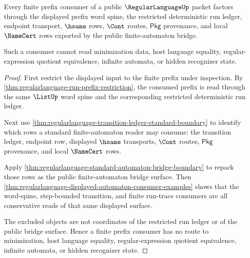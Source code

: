 \begin{theorem}
\label{thm:regularlanguage-prefix-bridge-consumer-boundary}
Every finite prefix consumer of a public $\RegularLanguageUp$ packet factors
through the displayed prefix word spine, the restricted deterministic run
ledger, endpoint transport, $\hsame$ rows, $\Cont$ routes, $\mathsf{Pkg}$
provenance, and local $\NameCert$ rows exported by the public finite-automaton
bridge.

Such a consumer cannot read minimization data, host language equality,
regular-expression quotient equivalence, infinite automata, or hidden
recognizer state.
\end{theorem}
\begin{proof}
First restrict the displayed input to the finite prefix under inspection.
By \autoref{thm:regularlanguage-run-prefix-restriction}, the consumed prefix is
read through the same $\ListUp$ word spine and the corresponding restricted
deterministic run ledger.

Next use
\autoref{thm:regularlanguage-transition-ledger-standard-boundary} to identify
which rows a standard finite-automaton reader may consume: the transition
ledger, endpoint row, displayed $\hsame$ transports, $\Cont$ routes,
$\mathsf{Pkg}$ provenance, and local $\NameCert$ rows.

Apply
\autoref{thm:regularlanguage-standard-automaton-bridge-boundary} to repack
those rows as the public finite-automaton bridge surface. Then
\autoref{thm:regularlanguage-displayed-automaton-consumer-examples} shows that
the word-spine, step-bounded transition, and finite run-trace consumers are
all conservative reads of that same displayed surface.

The excluded objects are not coordinates of the restricted run ledger or of
the public bridge surface. Hence a finite prefix consumer has no route to
minimization, host language equality, regular-expression quotient equivalence,
infinite automata, or hidden recognizer state.
\end{proof}

